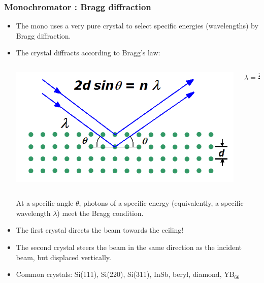 \documentclass[10pt, xcolor=x11names, compress]{beamer}
\begin{document}
\begin{frame}
  \frametitle{Monochromator : Bragg diffraction}

  \begin{itemize}
  \item The mono uses a very pure crystal to select specific energies
    (wavelengths) by Bragg diffraction.
  \item The crystal diffracts according to Bragg's law:
    \begin{center}
      \begin{columns}
        \begin{column}{0.45\linewidth}
          \includegraphics[width=\linewidth]{bl/bragg.png}
        \end{column}
        \begin{column}{0.2\linewidth}
          \Large
          $\lambda = \frac{2\pi\hbar c}{E}$
        \end{column}
      \end{columns}
    \end{center}
    At a specific angle $\theta$, photons of a specific energy
    (equivalently, a specific wavelength $\lambda$) meet the Bragg
    condition.
  \item The \alert{first crystal} directs the beam towards the
    ceiling!
  \item The \alert{second crystal} steers the beam in the same
    direction as the incident beam, but displaced vertically.
  \item Common crystals: Si(111), Si(220), Si(311), InSb, beryl,
    diamond, YB$_{66}$
  \end{itemize}

\end{frame}
\end{document}
